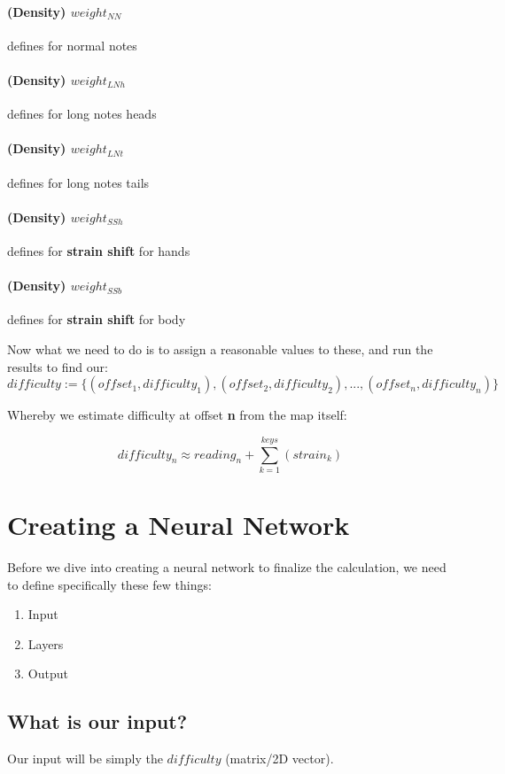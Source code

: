 \documentclass{article}
\begin{document}
\paragraph{(Density) $weight_{NN}$} defines for normal notes
\paragraph{(Density) $weight_{LNh}$} defines for long notes heads
\paragraph{(Density) $weight_{LNt}$} defines for long notes tails
\paragraph{(Density) $weight_{SSh}$} defines for \textbf{strain shift} for hands
\paragraph{(Density) $weight_{SSb}$} defines for \textbf{strain shift} for body 

Now what we need to do is to assign a reasonable values to these, and run the results to find our:
$$ difficulty := \lbrace(offset_1, difficulty_1), (offset_2, difficulty_2), ..., (offset_n, difficulty_n)\rbrace $$

Whereby we estimate difficulty at offset \textbf{n} from the map itself:

$$ difficulty_n \approx reading_n + \sum_{k=1}^{keys} \left(strain_k \right) $$

\section{Creating a Neural Network}

Before we dive into creating a neural network to finalize the calculation, we need to define specifically these few things:

\begin{enumerate}
	\item Input
	\item Layers
	\item Output
\end{enumerate}

\subsection{What is our input?}

Our input will be simply the $difficulty$ (matrix/2D vector).
\end{document}
